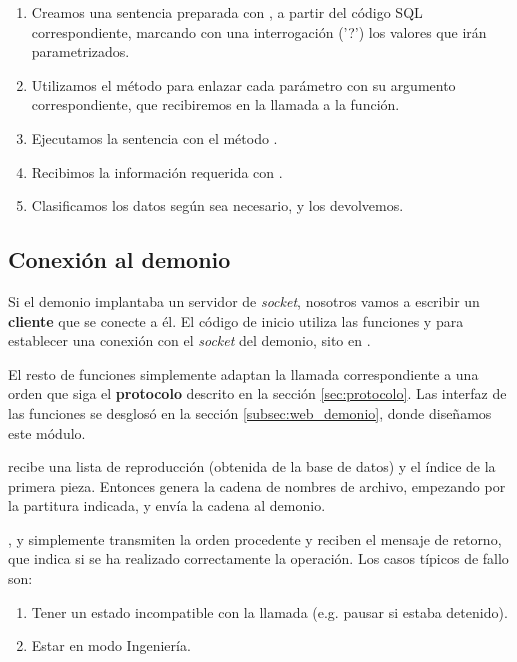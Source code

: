 \begin{enumerate}
	\item Creamos una sentencia preparada con , a partir del código SQL correspondiente, marcando con una interrogación ('?') los valores que irán parametrizados.
	\item Utilizamos el método  para enlazar cada parámetro con su argumento correspondiente, que recibiremos en la llamada a la función.
	\item Ejecutamos la sentencia con el método .
	\item Recibimos la información requerida con .
	\item Clasificamos los datos según sea necesario, y los devolvemos.
\end{enumerate}

\subsection{Conexión al demonio}

Si el demonio implantaba un servidor de \textit{socket}, nosotros vamos a escribir un \textbf{cliente} que se conecte a él. El código de inicio utiliza las funciones  y  para establecer una conexión con el \textit{socket} del demonio, sito en .

El resto de funciones simplemente adaptan la llamada correspondiente a una orden que siga el \textbf{protocolo} descrito en la sección \ref{sec:protocolo}. Las interfaz de las funciones se desglosó en la sección \ref{subsec:web_demonio}, donde diseñamos este módulo.

 recibe una lista de reproducción (obtenida de la base de datos) y el índice de la primera pieza. Entonces genera la cadena de nombres de archivo, empezando por la partitura indicada, y envía la cadena al demonio.

,  y  simplemente transmiten la orden procedente y reciben el mensaje de retorno, que indica si se ha realizado correctamente la operación. Los casos típicos de fallo son:

\begin{enumerate}
	\item Tener un estado incompatible con la llamada (e.g. pausar si estaba detenido).
	\item Estar en modo Ingeniería.
\end{enumerate}


